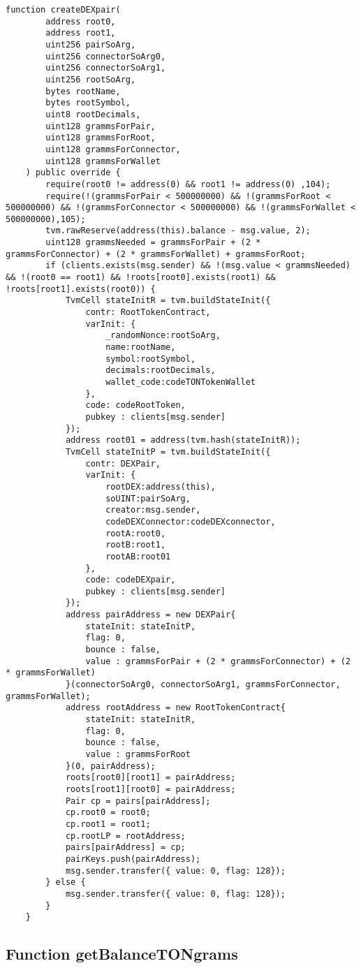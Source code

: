 \begin{lstlisting}[firstnumber=237]
	function createDEXpair(
		address root0,
		address root1,
		uint256 pairSoArg,
		uint256 connectorSoArg0,
		uint256 connectorSoArg1,
		uint256 rootSoArg,
		bytes rootName,
		bytes rootSymbol,
		uint8 rootDecimals,
		uint128 grammsForPair,
		uint128 grammsForRoot,
		uint128 grammsForConnector,
		uint128 grammsForWallet
	) public override {
		require(root0 != address(0) && root1 != address(0) ,104);
		require(!(grammsForPair < 500000000) && !(grammsForRoot < 500000000) && !(grammsForConnector < 500000000) && !(grammsForWallet < 500000000),105);
		tvm.rawReserve(address(this).balance - msg.value, 2);
		uint128 grammsNeeded = grammsForPair + (2 * grammsForConnector) + (2 * grammsForWallet) + grammsForRoot;
		if (clients.exists(msg.sender) && !(msg.value < grammsNeeded) && !(root0 == root1) && !roots[root0].exists(root1) && !roots[root1].exists(root0)) {
			TvmCell stateInitR = tvm.buildStateInit({
				contr: RootTokenContract,
				varInit: {
					_randomNonce:rootSoArg,
					name:rootName,
					symbol:rootSymbol,
					decimals:rootDecimals,
					wallet_code:codeTONTokenWallet
				},
				code: codeRootToken,
				pubkey : clients[msg.sender]
			});
			address root01 = address(tvm.hash(stateInitR));
			TvmCell stateInitP = tvm.buildStateInit({
				contr: DEXPair,
				varInit: {
					rootDEX:address(this),
					soUINT:pairSoArg,
					creator:msg.sender,
					codeDEXConnector:codeDEXconnector,
					rootA:root0,
					rootB:root1,
					rootAB:root01
				},
				code: codeDEXpair,
				pubkey : clients[msg.sender]
			});
			address pairAddress = new DEXPair{
				stateInit: stateInitP,
				flag: 0,
				bounce : false,
				value : grammsForPair + (2 * grammsForConnector) + (2 * grammsForWallet)
			}(connectorSoArg0, connectorSoArg1, grammsForConnector, grammsForWallet);
			address rootAddress = new RootTokenContract{
				stateInit: stateInitR,
				flag: 0,
				bounce : false,
				value : grammsForRoot
			}(0, pairAddress);
			roots[root0][root1] = pairAddress;
			roots[root1][root0] = pairAddress;
			Pair cp = pairs[pairAddress];
			cp.root0 = root0;
			cp.root1 = root1;
			cp.rootLP = rootAddress;
			pairs[pairAddress] = cp;
			pairKeys.push(pairAddress);
			msg.sender.transfer({ value: 0, flag: 128});
		} else {
			msg.sender.transfer({ value: 0, flag: 128});
		}
	}
\end{lstlisting}

\subsection{Function getBalanceTONgrams}

